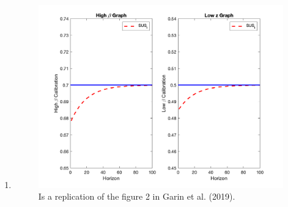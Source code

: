 \begin{enumerate}
    \item  
    \begin{figure}[H]
        \centering
        \includegraphics[width =.9\linewidth]{HW5/Q1_figure.png}
        \caption{Is a replication of the figure 2 in Garin et al. (2019).}
        \label{fig:my_label}
    \end{figure}
\end{enumerate}